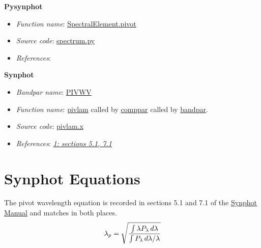 \documentclass[letterpaper,10pt,english]{sphinxtsr}
\begin{document}
\textbf{Pysynphot}
\begin{itemize}
\item {} 
\emph{Function name}: \href{https://trac.assembla.com/astrolib/browser/trunk/pysynphot/lib/pysynphot/spectrum.py\#L1060}{SpectralElement.pivot}

\item {} 
\emph{Source code}: \href{https://trac.assembla.com/astrolib/browser/trunk/pysynphot/lib/pysynphot/spectrum.py}{spectrum.py}

\item {} 
\emph{References}:

\end{itemize}

\textbf{Synphot}
\begin{itemize}
\item {} 
\emph{Bandpar name}: \href{https://svn.stsci.edu/trac/ssb/stsci\_python/browser/stsdas/trunk/stsdas/pkg/hst\_calib/synphot/doc/bandpar.hlp}{PIVWV}

\item {} 
\emph{Function name}: \href{https://svn.stsci.edu/trac/ssb/stsci\_python/browser/stsdas/trunk/stsdas/lib/synphot/pivlam.x}{pivlam}
called by \href{https://svn.stsci.edu/trac/ssb/stsci\_python/browser/stsdas/trunk/stsdas/pkg/hst\_calib/synphot/bandpar/comppar.x}{comppar} called by \href{https://svn.stsci.edu/trac/ssb/stsci\_python/browser/stsdas/trunk/stsdas/pkg/hst\_calib/synphot/bandpar/bandpar.x}{bandpar}.

\item {} 
\emph{Source code}: \href{https://svn.stsci.edu/trac/ssb/stsci\_python/browser/stsdas/trunk/stsdas/lib/synphot/pivlam.x}{pivlam.x}

\item {} 
\emph{References}: {\hyperref[references:ref1]{\emph{1: sections 5.1, 7.1}}}

\end{itemize}


\section{Synphot Equations}
\label{main:id21}
The pivot wavelength equation is recorded in sections 5.1 and 7.1 of the
\href{http://stsdas.stsci.edu/stsci\_python\_epydoc/SynphotManual.pdf}{Synphot Manual} and matches in both places.
\begin{gather}
\begin{split}\lambda_p = \sqrt{\frac{\int \lambda P_{\lambda}\,d\lambda}
                 {\int P_{\lambda}\,d\lambda/\lambda}}\end{split}\notag
\end{gather}
\end{document}
